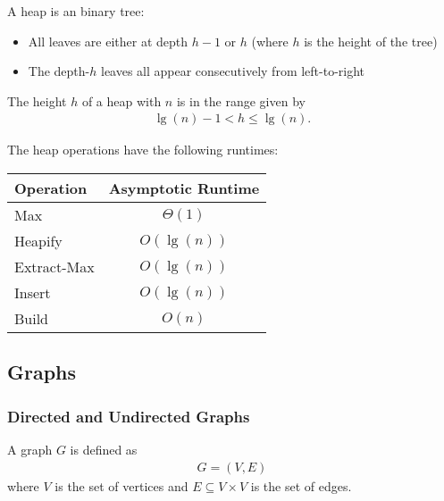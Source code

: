 \documentclass{article}
\begin{document}
\begin{definition}
	A heap is an  binary tree:
	\begin{itemize}
		\item All leaves are either at depth $h-1$ or $h$ (where $h$ is the height of the tree)
		\item The depth-$h$ leaves all appear consecutively from left-to-right
	\end{itemize}
\end{definition}
\begin{lemma}
	The height $h$ of a heap with $n$ is in the range given by
	\begin{align*}
		\lg(n)-1 < h \leq \lg(n).
	\end{align*}
\end{lemma}
\begin{theorem}
	The heap operations have the following runtimes:
	\\
	\begin{center}
	\begin{tabular}{| l | c |}
		\hline
		Operation & Asymptotic Runtime\\
		\hline
		Max & $\Theta(1)$\\
		\hline
		Heapify & $O(\lg(n))$\\
		\hline
		Extract-Max & $O(\lg(n))$\\
		\hline
		Insert & $O(\lg(n))$\\
		\hline
		Build & $O(n)$\\
		\hline
	\end{tabular}
	\end{center}
\end{theorem}


\subsection{Graphs}


\subsubsection{Directed and Undirected Graphs}

\begin{definition}
	A graph $G$ is defined as
	\begin{align*}
		G = (V,E)
	\end{align*}
	where $V$ is the set of vertices and $E\subseteq V\times V$ is the set of edges.
\end{definition}
\end{document}
